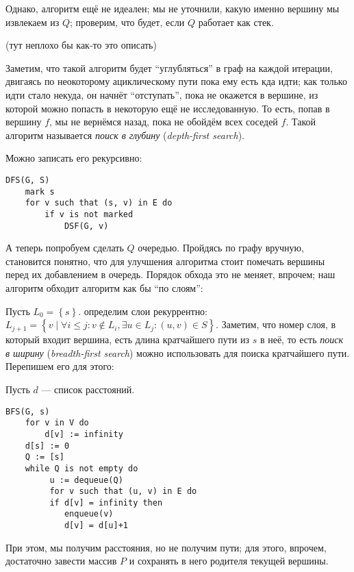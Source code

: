 Однако, алгоритм ещё не идеален; мы не уточнили, какую именно вершину мы извлекаем из $Q$; проверим, что будет, если $Q$ работает как стек.

(тут неплохо бы как-то это описать)

Заметим, что такой алгоритм будет ``углубляться'' в граф на каждой итерации, двигаясь по неокоторому ациклическому пути пока ему есть кда идти; как только идти стало некуда, он начнёт ``отступать'', пока не окажется в вершине, из которой можно попасть в некоторую ещё не исследованную. То есть, попав в вершину $f$, мы не вернёмся назад, пока не обойдём всех соседей $f$. Такой алгоритм называется \emph{поиск в глубину} (\emph{depth-first search}).

Можно записать его рекурсивно:

\begin{lstlisting}
DFS(G, S)
    mark s
    for v such that (s, v) in E do
        if v is not marked
            DSF(G, v)
\end{lstlisting}

А теперь попробуем сделать $Q$ очередью. Пройдясь по графу вручную, становится понятно, что для улучшения алгоритма стоит помечать вершины перед их добавлением в очередь. Порядок обхода это не меняет, впрочем; наш алгоритм обходит алгоритм как бы ``по слоям'':

Пусть $L_0 = \left\{ s \right\}$. определим слои рекуррентно: $L_{j+1} = \left\{ v\mid \forall i \leqslant j: v\not\in L_i, \exists u \in L_j:(u, v) \in S \right\}$. Заметим, что номер слоя, в который входит вершина, есть длина кратчайшего пути из $s$ в неё, то есть \emph{поиск в ширину} (\emph{breadth-first search}) можно использовать для поиска кратчайшего пути. Перепишем его для этого:

Пусть $d$ --- список расстояний.
\begin{lstlisting}
BFS(G, s)
    for v in V do
        d[v] := infinity
    d[s] := 0
    Q := [s]
    while Q is not empty do
         u := dequeue(Q)
         for v such that (u, v) in E do
         if d[v] = infinity then
            enqueue(v)
            d[v] = d[u]+1
\end{lstlisting}

При этом, мы получим расстояния, но не получим пути; для этого, впрочем, достаточно завести массив $P$ и сохранять в него родителя текущей вершины.

